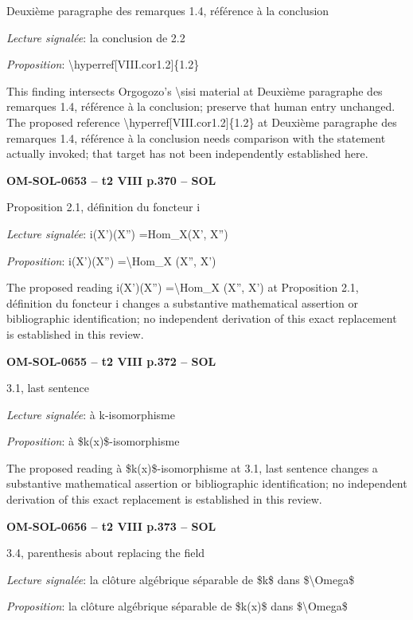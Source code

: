 Deuxième paragraphe des remarques 1.4, référence à la conclusion\par
\emph{Lecture signalée}: la conclusion de 2.2\par
\emph{Proposition}: \textbackslash{}hyperref[VIII.cor1.2]\{1.2\}\par
This finding intersects Orgogozo's \textbackslash{}sisi material at Deuxième paragraphe des remarques 1.4, référence à la conclusion; preserve that human entry unchanged. The proposed reference \textbackslash{}hyperref[VIII.cor1.2]\{1.2\} at Deuxième paragraphe des remarques 1.4, référence à la conclusion needs comparison with the statement actually invoked; that target has not been independently established here.\par
\par\noindent\textbf{OM-SOL-0653 -- t2 VIII p.370 -- SOL}\par
Proposition 2.1, définition du foncteur i\par
\emph{Lecture signalée}: i(X')(X'') =\allowbreak  Hom\_X(X', X'')\par
\emph{Proposition}: i(X')(X'') =\allowbreak  \textbackslash{}Hom\_X (X'', X')\par
The proposed reading i(X')(X'') =\allowbreak  \textbackslash{}Hom\_X (X'', X') at Proposition 2.1, définition du foncteur i changes a substantive mathematical assertion or bibliographic identification; no independent derivation of this exact replacement is established in this review.\par
\par\noindent\textbf{OM-SOL-0655 -- t2 VIII p.372 -- SOL}\par
3.1, last sentence\par
\emph{Lecture signalée}: à k-isomorphisme\par
\emph{Proposition}: à \$k(x)\$-isomorphisme\par
The proposed reading à \$k(x)\$-isomorphisme at 3.1, last sentence changes a substantive mathematical assertion or bibliographic identification; no independent derivation of this exact replacement is established in this review.\par
\par\noindent\textbf{OM-SOL-0656 -- t2 VIII p.373 -- SOL}\par
3.4, parenthesis about replacing the field\par
\emph{Lecture signalée}: la clôture algébrique séparable de \$k\$ dans \$\textbackslash{}Omega\$\par
\emph{Proposition}: la clôture algébrique séparable de \$k(x)\$ dans \$\textbackslash{}Omega\$\par
